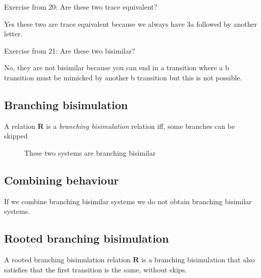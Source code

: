 Exercise from 20: Are these two trace equivalent? 

Yes these two are trace equivalent because we always have 3a followed by another letter. 

Exercise from 21: Are these two bisimilar?

No, they are not bisimilar because you can end in a transition where a b transition must be mimicked
by another b transition but this is not possible.


\subsection{Branching bisimulation}

A relation \(\pmb{R}\) is a \emph{branching bisimulation} relation iff, some branches can be 
skipped 

\begin{figure}[H]
  \centering

  \caption{These two systems are branching bisimilar}
\end{figure}

\subsection{Combining behaviour}

If we combine branching bisimilar systems we do not obtain branching bisimilar systems.

\subsection{Rooted branching bisimulation}

A rooted branching bisimulation relation \( \pmb{R}\) is a branching bisimulation that also
satisfies that the first transition is the same, without skips.

